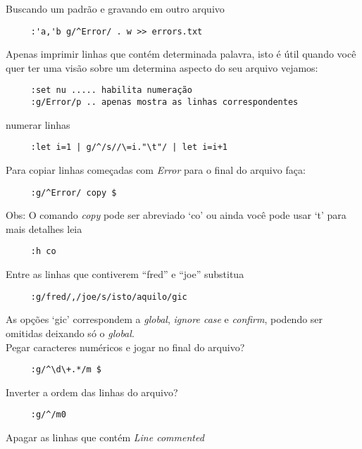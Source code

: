 Buscando um padrão e gravando em outro arquivo

\begin{verbatim}
     :'a,'b g/^Error/ . w >> errors.txt
\end{verbatim}

Apenas imprimir linhas que contém determinada palavra, isto é útil
quando você quer ter uma visão sobre um determina aspecto
do seu arquivo vejamos:

\begin{verbatim}
     :set nu ..... habilita numeração
     :g/Error/p .. apenas mostra as linhas correspondentes
\end{verbatim}

numerar linhas

\begin{verbatim}
     :let i=1 | g/^/s//\=i."\t"/ | let i=i+1
\end{verbatim}

Para copiar linhas começadas com {\em Error} para o final do arquivo faça:

\begin{verbatim}
     :g/^Error/ copy $
\end{verbatim}

Obs: O comando {\em copy} pode ser abreviado `co' ou ainda você pode usar `t'
para mais detalhes leia

\begin{verbatim}
     :h co
\end{verbatim}

Entre as linhas que contiverem ``fred'' e ``joe'' substitua

\begin{verbatim}
     :g/fred/,/joe/s/isto/aquilo/gic
\end{verbatim}

As opções `gic' correspondem a {\em global}, {\em ignore case} e {\em
confirm}, podendo ser omitidas deixando só o {\em global}. \\


Pegar caracteres numéricos e jogar no final do arquivo?

\begin{verbatim}
     :g/^\d\+.*/m $
\end{verbatim}

Inverter a ordem das linhas do arquivo?

\begin{verbatim}
     :g/^/m0
\end{verbatim}

Apagar as linhas que contém {\em Line commented}

